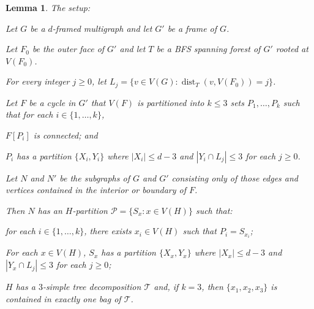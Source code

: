 \documentclass{patmorin}
\theoremstyle{plain}
\newtheorem{lem}[thm]{Lemma}
\theoremstyle{definition}
\newcommand{\note}[2]{\noindent{\color{red}[#1:~#2]}}
\DeclareMathOperator{\dist}{dist}
\newcommand{\PP}{\mathcal{P}}
\renewcommand{\ge}{\geqslant}
\renewcommand{\le}{\leqslant}
\begin{document}

\begin{lem}
	\label{induction} The setup:
	\begin{compactenum}
		\item Let $G$ be a $d$-framed multigraph and let $G'$ be a frame of $G$.
		\item Let $F_0$ be the outer face of $G'$ and let $T$ be a BFS spanning forest of $G'$ rooted at $V(F_0)$.
		\item For every integer $j\ge 0$, let $L_j=\{v\in V(G):\dist_T(v,V(F_0))=j\}$.
		\item Let $F$ be a cycle in $G'$ that $V(F)$ is partitioned into $k\le 3$ sets $P_1,\ldots,P_k$ such that for each $i\in\{1,\ldots,k\}$,
		\begin{compactenum}
			\item $F[P_i]$ is connected; and
			\item $P_i$ has a partition $\{X_i,Y_i\}$ where $|X_i|\le d-3$ and $|Y_i\cap L_j| \le 3$ for each $j\ge 0$.
		\end{compactenum}
		\item Let $N$ and $N'$ be the subgraphs of $G$ and $G'$ consisting only of those edges and vertices contained in the interior or boundary of $F$.
	\end{compactenum}
	Then $N$ has an $H$-partition $\PP=\{S_x: x\in V(H)\}$ such that:
	\begin{compactenum}[(i)]
		\item for each $i\in\{1,\ldots,k\}$, there exists $x_i\in V(H)$ such that $P_i=S_{x_i}$;
		\item For each $x\in V(H)$, $S_x$ has a partition $\{X_x,Y_x\}$ where $|X_x|\le d-3$ and $|Y_x\cap L_j|\le 3$ for each $j\ge 0$;
		\item $H$ has a $3$-simple tree decomposition $\mathcal{T}$ and, if $k=3$, then $\{x_1,x_2,x_3\}$ is contained in exactly one bag of $\mathcal{T}$.
	\end{compactenum}

\end{lem}
\end{document}
